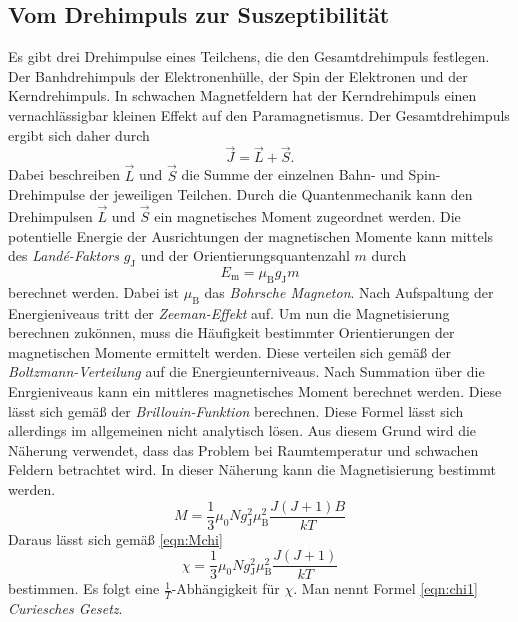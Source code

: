 \subsection{Vom Drehimpuls zur Suszeptibilität}
\label{subsec:drehsus}
Es gibt drei Drehimpulse eines Teilchens, die den Gesamtdrehimpuls festlegen. Der Banhdrehimpuls der Elektronenhülle, der Spin der Elektronen und der Kerndrehimpuls. In schwachen 
Magnetfeldern hat der Kerndrehimpuls einen vernachlässigbar kleinen Effekt auf den Paramagnetismus. Der Gesamtdrehimpuls ergibt sich daher durch 
\begin{equation*}
    \vec{J} = \vec{L} + \vec{S}.
\end{equation*}
Dabei beschreiben $\vec{L}$ und $\vec{S}$ die Summe der einzelnen Bahn- und Spin- Drehimpulse der jeweiligen Teilchen. Durch die Quantenmechanik kann den Drehimpulsen 
$\vec{L}$ und $\vec{S}$
ein magnetisches Moment zugeordnet werden. 
Die potentielle Energie der Ausrichtungen der magnetischen Momente kann mittels des \textit{Landé-Faktors} $g_{\text{J}}$ und der Orientierungsquantenzahl $m$ durch 
\begin{equation}
    E_{\text{m}} = \mu_{\text{B}} g_{\text{J}} m
\end{equation} 
berechnet werden. Dabei ist $\mu_{\text{B}}$ das \textit{Bohrsche Magneton}. Nach Aufspaltung der Energieniveaus tritt der \textit{Zeeman-Effekt} auf. Um nun die Magnetisierung
berechnen zukönnen, muss die Häufigkeit bestimmter Orientierungen der magnetischen Momente ermittelt werden. Diese verteilen sich gemäß der \textit{Boltzmann-Verteilung}
auf die  Energieunterniveaus. Nach Summation über die Enrgieniveaus kann ein mittleres magnetisches Moment berechnet werden. Diese lässt sich gemäß der \textit{Brillouin-Funktion}
berechnen. Diese Formel lässt sich allerdings im allgemeinen nicht analytisch lösen. 
Aus diesem Grund wird die Näherung verwendet, dass das Problem bei Raumtemperatur und schwachen Feldern betrachtet wird.
In dieser Näherung kann die Magnetisierung bestimmt werden.
\begin{equation*}
    M = \frac{1}{3}\mu_0 N g^2_{\text{J}} \mu^2_{\text{B}} \frac{J(J+1)B}{kT}
\end{equation*}
Daraus lässt sich gemäß \autoref{eqn:Mchi}
\begin{equation}
    \label{eqn:chi1}
    \chi = \frac{1}{3}\mu_0 N g^2_{\text{J}} \mu^2_{\text{B}} \frac{J(J+1)}{kT}
\end{equation}  
bestimmen.
Es folgt eine $\frac{1}{T}$-Abhängigkeit für $\chi$. Man nennt Formel \eqref{eqn:chi1} \textit{Curiesches Gesetz}.

